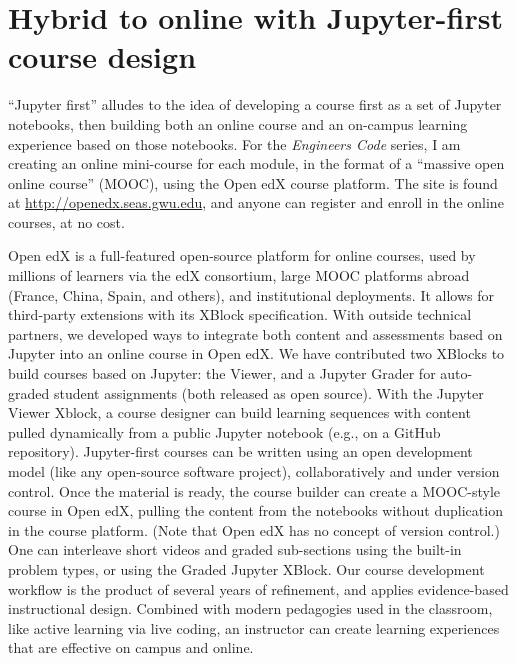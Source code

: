 \documentclass[10pt,journal,compsoc]{IEEEtran}
\begin{document}
\section{Hybrid to online with Jupyter-first course design}

``Jupyter first'' alludes to the idea of developing a course first as a set of Jupyter notebooks, then building both an online course and an on-campus learning experience based on those notebooks. 
For the \emph{Engineers Code} series, I am creating an online mini-course for each module,  in the format of a ``massive open online course'' (MOOC), using the Open edX course platform. 
The site is found at \url{http://openedx.seas.gwu.edu}, and anyone can register and enroll in the online courses, at no cost. 

Open edX is a full-featured open-source platform for online courses, used by millions of learners via the edX consortium, large MOOC platforms abroad (France, China, Spain, and others), and institutional deployments. 
It allows for third-party extensions with its XBlock specification. 
With outside technical partners, we developed ways to integrate both content and assessments based on Jupyter into an online course in Open edX. 
We have contributed two XBlocks to build courses based on Jupyter: the Viewer, and a Jupyter Grader for auto-graded student assignments (both released as open source). 
With the Jupyter Viewer Xblock, a course designer can build learning sequences with content pulled dynamically from a public Jupyter notebook (e.g., on a GitHub repository). 
Jupyter-first courses can be written using an open development model (like any open-source software project), collaboratively and under version control. 
Once the material is ready, the course builder can create a MOOC-style course in Open edX, pulling the content from the notebooks without duplication in the course platform. 
(Note that Open edX has no concept of version control.) 
One can interleave short videos and graded sub-sections using the built-in problem types, or using the Graded Jupyter XBlock. 
Our course development workflow is the product of several years of refinement, and applies evidence-based instructional design. 
Combined with modern pedagogies used in the classroom, like active learning via live coding, an instructor can create learning experiences that are effective on campus and online. 

\bigskip
\end{document}
